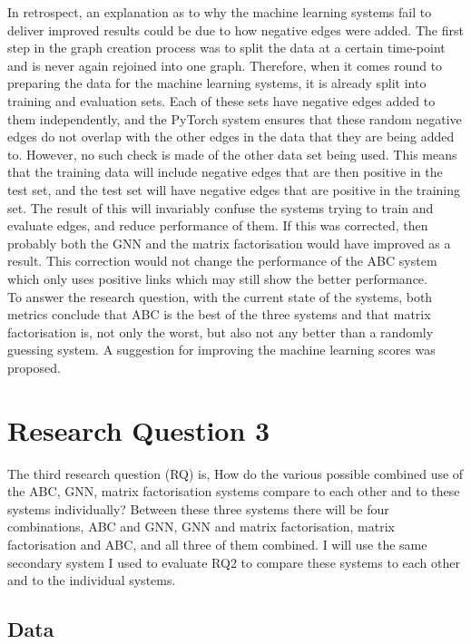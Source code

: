 \documentclass{l4proj}
\begin{document}
In retrospect, an explanation as to why the machine learning systems fail to deliver improved results could be due to how negative edges were added. The first step in the graph creation process was to split the data at a certain time-point and is never again rejoined into one graph. Therefore, when it comes round to preparing the data for the machine learning systems, it is already split into training and evaluation sets. Each of these sets have negative edges added to them independently, and the PyTorch system ensures that these random negative edges do not overlap with the other edges in the data that they are being added to. However, no such check is made of the other data set being used. This means that the training data will include negative edges that are then positive in the test set, and the test set will have negative edges that are positive in the training set. The result of this will invariably confuse the systems trying to train and evaluate edges, and reduce performance of them. If this was corrected, then probably both the GNN and the matrix factorisation would have improved as a result. This correction would not change the performance of the ABC system which only uses positive links which may still show the better performance. \\

To answer the research  question, with the current state of the systems, both metrics conclude that ABC is the best of the three systems and that matrix factorisation is, not only the worst, but also not any better than a randomly guessing system. A suggestion for improving the machine learning scores was proposed.\\

\section{Research Question 3}

The third research question (RQ) is, How do the various possible combined use of the ABC, GNN, matrix factorisation systems compare to each other and to these systems individually? Between these three systems there will be four combinations, ABC and GNN, GNN and matrix factorisation, matrix factorisation and ABC, and all three of them combined. I will use the same secondary system I used to evaluate RQ2 to compare these systems to each other and to the individual systems. \\

\subsection{Data}
\end{document}
